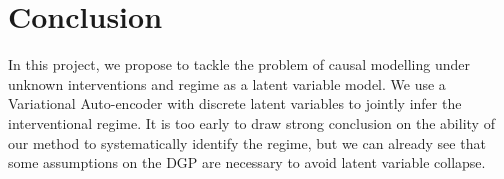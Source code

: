 \documentclass{article}
\begin{document}
\section{Conclusion}\label{subsec:Conclusion}

In this project, we propose to tackle the problem of causal modelling under unknown interventions and regime as a latent variable model. We use a Variational Auto-encoder with discrete latent variables to jointly infer the interventional regime. It is too early to draw strong conclusion on the ability of our method to systematically identify the regime, but we can already see that some assumptions on the DGP are necessary to avoid latent variable collapse.



\end{document}
